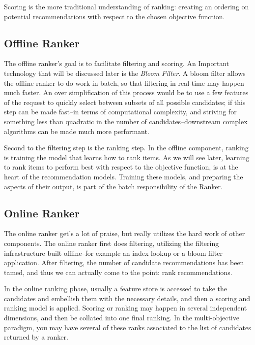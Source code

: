 Scoring is the more traditional understanding of ranking: creating an ordering on potential recommendations with respect to the chosen objective function.

\subsection{Offline Ranker}

The offline ranker's goal is to facilitate filtering and scoring. An Important technology that will be discussed later is the \emph{Bloom Filter}. A bloom filter allows the offline ranker to do work in batch, so that filtering in real-time may happen much faster. An over simplification of this process would be to use a few features of the request to quickly select between subsets of all possible candidates; if this step can be made fast–in terms of computational complexity, and striving for something less than quadratic in the number of candidates–downstream complex algorithms can be made much more performant.

Second to the filtering step is the ranking step. In the offline component, ranking is training the model that learns how to rank items. As we will see later, learning to rank items to perform best with respect to the objective function, is at the heart of the recommendation models. Training these models, and preparing the aspects of their output, is part of the batch responsibility of the Ranker.

\subsection{Online Ranker}

The online ranker get's a lot of praise, but really utilizes the hard work of other components. The online ranker first does filtering, utilizing the filtering infrastructure built offline–for example an index lookup or a bloom filter application. After filtering, the number of candidate recommendations has been tamed, and thus we can actually come to the point: rank recommendations.

In the online ranking phase, usually a feature store is accessed to take the candidates and embellish them with the necessary details, and then a scoring and ranking model is applied. Scoring or ranking may happen in several independent dimensions, and then be collated into one final ranking. In the multi-objective paradigm, you may have several of these ranks associated to the list of candidates returned by a ranker.

